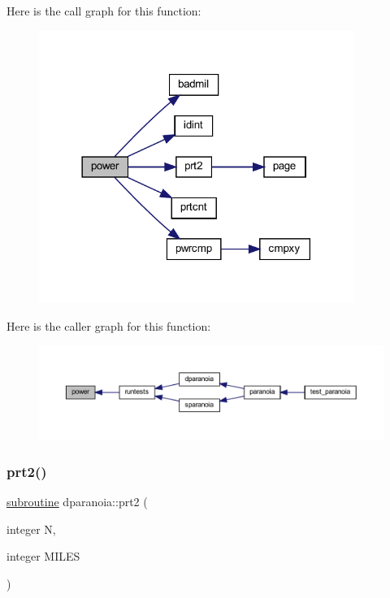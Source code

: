 Here is the call graph for this function\+:
\nopagebreak
\begin{figure}[H]
\begin{center}
\leavevmode
\includegraphics[width=290pt]{dparanoia_8f90_a908ef801c2dc7c4b54f1a43f007a4dc5_cgraph}
\end{center}
\end{figure}
Here is the caller graph for this function\+:
\nopagebreak
\begin{figure}[H]
\begin{center}
\leavevmode
\includegraphics[width=350pt]{dparanoia_8f90_a908ef801c2dc7c4b54f1a43f007a4dc5_icgraph}
\end{center}
\end{figure}
\mbox{\label{dparanoia_8f90_adb64903f8562ae9b54e1bc9688d73256}} 
\subsubsection{\texorpdfstring{prt2()}{prt2()}}
{\footnotesize\ttfamily \hyperlink{M__stopwatch_83_8txt_acfbcff50169d691ff02d4a123ed70482}{subroutine} dparanoia\+::prt2 (\begin{DoxyParamCaption}\item[{integer}]{N,  }\item[{integer}]{M\+I\+L\+ES }\end{DoxyParamCaption})}



